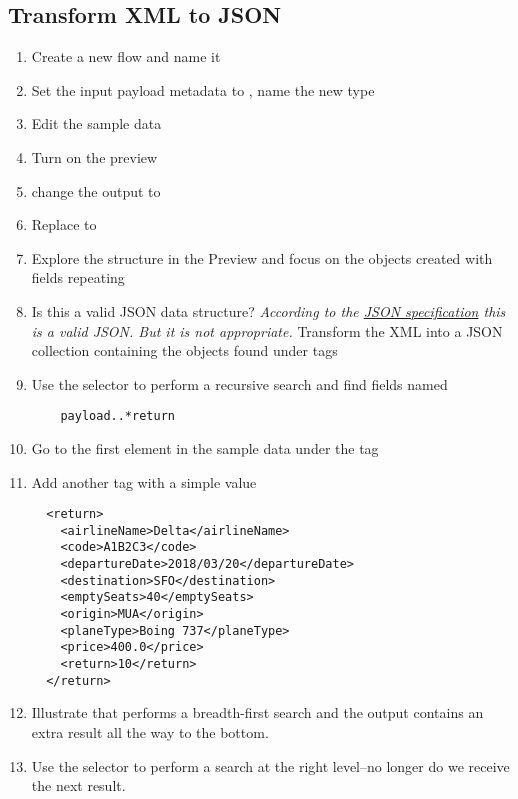 \subsection{Transform XML to JSON}
\begin{enumerate}[resume*]
\item Create a new flow and name it 
\item Set the input payload metadata to , name the new type 
\item Edit the sample data
\item Turn on the preview
\item change the output to 
\item Replace \ttt{\{\}} to 
\item Explore the structure in the Preview and focus on the objects created with  fields repeating
\item Is this a valid JSON data structure?
  \newline
  \emph{
    According to the \href{https://www.ecma-international.org/publications/files/ECMA-ST/ECMA-404.pdf}{JSON specification} this is a valid JSON. But it is not appropriate.
  }
  \newline
  Transform the XML into a JSON collection containing the objects found under  tags
\item Use the  selector to perform a recursive search and find fields named 
  \begin{lstlisting}
    payload..*return
  \end{lstlisting}
\item Go to the first element in the sample data under the  tag
\item Add another  tag with a simple value
\begin{lstlisting}
  <return>
    <airlineName>Delta</airlineName>
    <code>A1B2C3</code>
    <departureDate>2018/03/20</departureDate>
    <destination>SFO</destination>
    <emptySeats>40</emptySeats>
    <origin>MUA</origin>
    <planeType>Boing 737</planeType>
    <price>400.0</price>
    <return>10</return>
  </return>
\end{lstlisting}
\item Illustrate that  performs a breadth-first search and the output contains an extra result all the way to the bottom. 
\item Use the  selector to perform a search at the right level--no longer do we receive the next  result. 

\end{enumerate}

